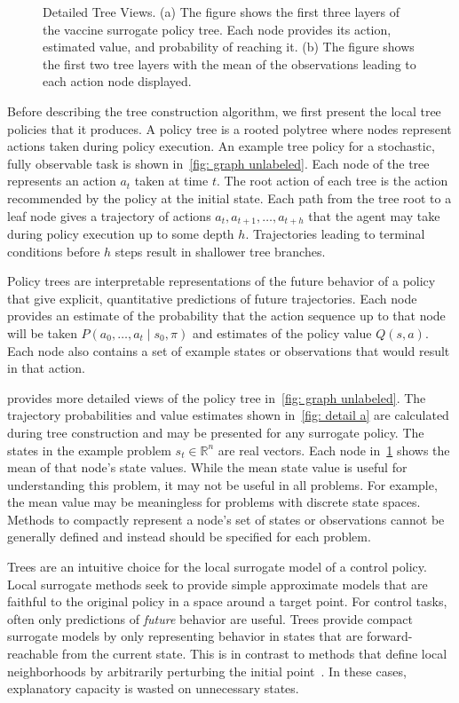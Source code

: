 \documentclass[letterpaper]{article} %
\begin{document}
\begin{figure}[ht!]
\begin{subfigure}[t]{0.43\textwidth}
\caption{}\label{fig: detail b}
\end{subfigure}
\caption{Detailed Tree Views. (a) The figure shows the first three layers of the vaccine surrogate policy tree. Each node provides its action, estimated value, and probability of reaching it. (b) The figure shows the first two tree layers with the mean of the observations leading to each action node displayed.
}
\label{fig: example graph}
\end{figure}
Before describing the tree construction algorithm, we first present the local tree policies that it produces.
A policy tree is a rooted polytree where nodes represent actions taken during policy execution.
An example tree policy for a stochastic, fully observable task is shown in~\cref{fig: graph unlabeled}.
Each node of the tree represents an action $a_t$ taken at time $t$.
The root action of each tree is the action recommended by the policy at the initial state.
Each path from the tree root to a leaf node gives a trajectory of actions $a_t, a_{t+1}, \dots, a_{t + h}$ that the agent may take during policy execution up to some depth $h$.
Trajectories leading to terminal conditions before $h$ steps result in shallower tree branches.

Policy trees are interpretable representations of the future behavior of a policy that give explicit, quantitative predictions of future trajectories.
Each node provides an estimate of the probability that the action sequence up to that node will be taken $P(a_0, \dots, a_t \mid s_0, \pi)$ and estimates of the policy value $Q(s, a)$.
Each node also contains a set of example states or observations that would result in that action.

 provides more detailed views of the policy tree in~\cref{fig: graph unlabeled}.
The trajectory probabilities and value estimates shown in~\cref{fig: detail a} are calculated during tree construction and may be presented for any surrogate policy.
The states in the example problem $s_t \in \mathbb{R}^{n}$ are real vectors.
Each node in~\cref{fig: detail b} shows the mean of that node's state values.
While the mean state value is useful for understanding this problem, it may not be useful in all problems.
For example, the mean value may be meaningless for problems with discrete state spaces.
Methods to compactly represent a node's set of states or observations cannot be generally defined and instead should be specified for each problem.

Trees are an intuitive choice for the local surrogate model of a control policy.
Local surrogate methods seek to provide simple approximate models that are faithful to the original policy in a space around a target point.
For control tasks, often only predictions of \emph{future} behavior are useful.
Trees provide compact surrogate models by only representing behavior in states that are forward-reachable from the current state.
This is in contrast to methods that define local neighborhoods by arbitrarily perturbing the initial point~\cite{ribeiro2016}.
In these cases, explanatory capacity is wasted on unnecessary states.
\end{document}
